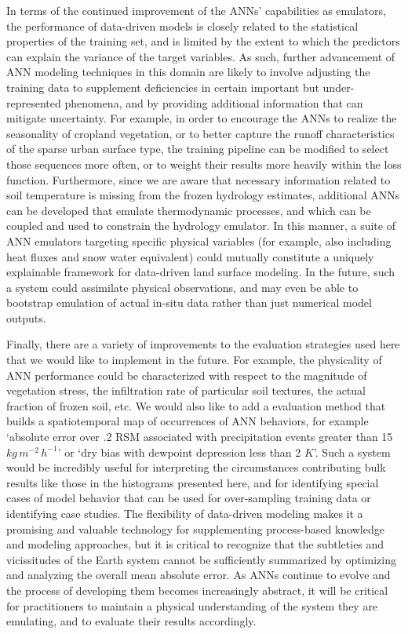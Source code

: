 In terms of the continued improvement of the ANNs' capabilities as emulators, the performance of data-driven models is closely related to the statistical properties of the training set, and is limited by the extent to which the predictors can explain the variance of the target variables. As such, further advancement of ANN modeling techniques in this domain are likely to involve adjusting the training data to supplement deficiencies in certain important but under-represented phenomena, and by providing additional information that can mitigate uncertainty. For example, in order to encourage the ANNs to realize the seasonality of cropland vegetation, or to better capture the runoff characteristics of the sparse urban surface type, the training pipeline can be modified to select those sequences more often, or to weight their results more heavily within the loss function. Furthermore, since we are aware that necessary information related to soil temperature is missing from the frozen hydrology estimates, additional ANNs can be developed that emulate thermodynamic processes, and which can be coupled and used to constrain the hydrology emulator. In this manner, a suite of ANN emulators targeting specific physical variables (for example, also including heat fluxes and snow water equivalent) could mutually constitute a uniquely explainable framework for data-driven land surface modeling. In the future, such a system could assimilate physical observations, and may even be able to bootstrap emulation of actual in-situ data rather than just numerical model outputs.

Finally, there are a variety of improvements to the evaluation strategies used here that we would like to implement in the future. For example, the physicality of ANN performance could be characterized with respect to the magnitude of vegetation stress, the infiltration rate of particular soil textures, the actual fraction of frozen soil, etc. We would also like to add a evaluation method that builds a spatiotemporal map of occurrences of ANN behaviors, for example `absolute error over .2 RSM associated with precipitation events greater than 15 $kg\,m^{-2}\,h^{-1}$' or `dry bias with dewpoint depression less than 2 $K$'. Such a system would be incredibly useful for interpreting the circumstances contributing bulk results like those in the histograms presented here, and for identifying special cases of model behavior that can be used for over-sampling training data or identifying case studies. The flexibility of data-driven modeling makes it a promising and valuable technology for supplementing process-based knowledge and modeling approaches, but it is critical to recognize that the subtleties and vicissitudes of the Earth system cannot be sufficiently summarized by optimizing and analyzing the overall mean absolute error. As ANNs continue to evolve and the process of developing them becomes increasingly abstract, it will be critical for practitioners to maintain a physical understanding of the system they are emulating, and to evaluate their results accordingly.
